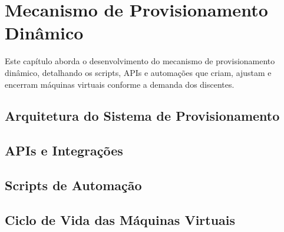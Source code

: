 \chapter{Mecanismo de Provisionamento Dinâmico}

Este capítulo aborda o desenvolvimento do mecanismo de provisionamento dinâmico, detalhando os scripts, APIs e automações que criam, ajustam e encerram máquinas virtuais conforme a demanda dos discentes.

\section{Arquitetura do Sistema de Provisionamento}

\section{APIs e Integrações}

\section{Scripts de Automação}

\section{Ciclo de Vida das Máquinas Virtuais}

